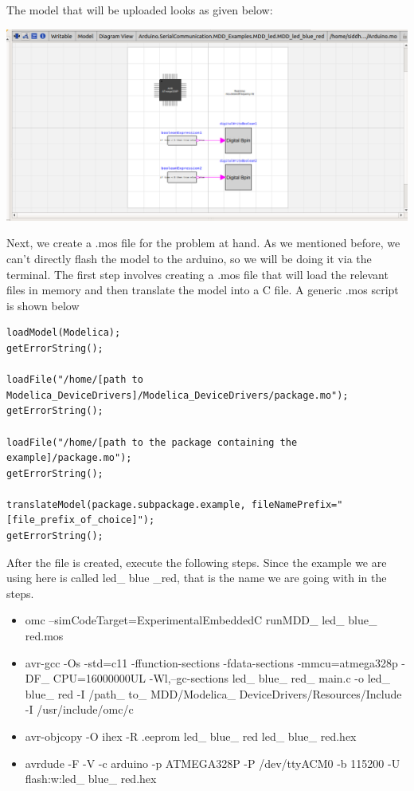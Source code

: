 \documentclass{hitec}
\begin{document}
The model that will be uploaded looks as given below:
\begin{center}
\includegraphics[scale=0.25]{Model.png}
\end{center}

Next, we create a .mos file for the problem at hand. As we mentioned before, we can't directly flash the model to the arduino, so we will be doing it via the terminal. The first step involves creating a .mos file that will load the relevant files in memory and then translate the model into a C file. A generic .mos script is shown below
\begin{lstlisting}
loadModel(Modelica);
getErrorString();

loadFile("/home/[path to Modelica_DeviceDrivers]/Modelica_DeviceDrivers/package.mo");
getErrorString();

loadFile("/home/[path to the package containing the example]/package.mo");
getErrorString();

translateModel(package.subpackage.example, fileNamePrefix="[file_prefix_of_choice]");
getErrorString();
\end{lstlisting}

After the file is created, execute the following steps. Since the example we are using here is called led\_ blue \_red, that is the name we are going with in the steps.
\\
\begin{itemize}
\item  omc --simCodeTarget=ExperimentalEmbeddedC runMDD\_ led\_ blue\_ red.mos
\item avr-gcc -Os -std=c11 -ffunction-sections -fdata-sections -mmcu=atmega328p -DF\_ CPU=16000000UL -Wl,--gc-sections led\_ blue\_ red\_ main.c -o led\_ blue\_ red -I /path\_ to\_ MDD/Modelica\_ DeviceDrivers/Resources/Include -I /usr/include/omc/c
\item  avr-objcopy -O ihex -R .eeprom led\_ blue\_ red led\_ blue\_ red.hex
\item avrdude -F -V -c arduino -p ATMEGA328P -P /dev/ttyACM0 -b 115200 -U flash:w:led\_ blue\_ red.hex

\end{itemize}
\end{document}
